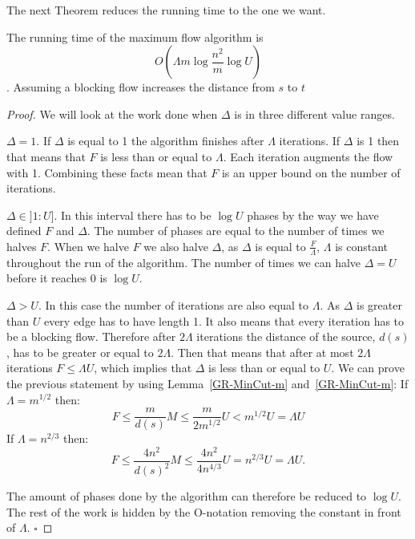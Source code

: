 The next Theorem reduces the running time to the one we want.
\begin{theorem}
	The running time of the maximum flow algorithm is $$O(\Lambda m\log{\frac{n^2}{m}} \log{U})$$. Assuming a blocking flow increases the distance from $s$ to $t$
\end{theorem}
\begin{proof}
	We will look at the work done when $\Delta$ is in three different value ranges.
	
	$\Delta = 1$. If $\Delta$ is equal to 1 the algorithm finishes after $\Lambda$ iterations. If $\Delta$ is 1 then that means that $F$ is less than or equal to
	$\Lambda$. Each iteration augments the flow with 1. Combining these facts mean that $F$ is an upper bound on the number of iterations.
	
	$\Delta \in ]1:U]$. In this interval there has to be $\log{U}$ phases by the way we have defined $F$ and $\Delta$. The number of phases are equal
	to the number of times we halves $F$. When we halve $F$ we also halve $\Delta$, as $\Delta$ is equal to $\frac{F}{\Lambda}$, $\Lambda$ is constant
	throughout the run of the algorithm. 
	The number of times we can halve $\Delta = U$ before it reaches 0 is $\log{U}$.
	
	$\Delta > U$. In this case the number of iterations are also equal to $\Lambda$. As $\Delta$ is greater than $U$ every edge has to have length 1. It
	also means that every iteration has to be a blocking flow. Therefore after $2\Lambda$ iterations the distance of the source, $d(s)$, has to be greater or
	equal to $2\Lambda$. Then that means that after at most $2\Lambda$ iterations $F \leq \Lambda U$, which implies that $\Delta$ is less than or equal to $U$.
	We can prove the previous statement by using Lemma~\ref{GR-MinCut-m} and~\ref{GR-MinCut-m}:
	If $\Lambda = m^{1/2}$ then:
	$$F \leq \frac{m}{d(s)} M \leq \frac{m}{2m^{1/2}}U < m^{1/2}U = \Lambda U$$
	If $\Lambda = n^{2/3}$ then:
	$$F \leq \frac{4n^2}{d(s)^2}M \leq \frac{4n^2}{4n^{4/3}}U = n^{2/3}U = \Lambda U.$$
	
	The amount of phases done by the algorithm can therefore be reduced to $\log{U}$. The rest of the work is hidden by the O-notation removing the constant
	in front of $\Lambda$. $\square$
\end{proof}

